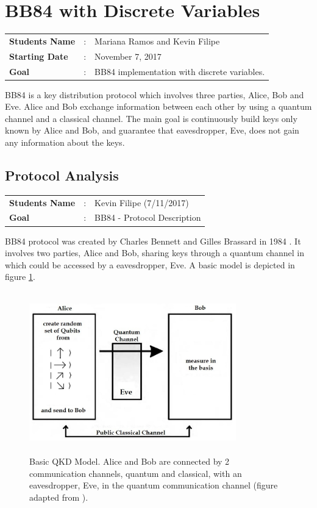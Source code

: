 \clearpage
\section{BB84 with Discrete Variables}

\begin{tcolorbox}	
\begin{tabular}{p{2.75cm} p{0.2cm} p{10.5cm}} 	
\textbf{Students Name}  &:& Mariana Ramos and Kevin Filipe\\
\textbf{Starting Date} &:& November 7, 2017\\
\textbf{Goal}          &:& BB84 implementation with discrete variables.
\end{tabular}
\end{tcolorbox}

BB84 is a key distribution protocol which involves three parties, Alice, Bob and Eve. Alice and Bob exchange information between each other by using a quantum channel and a classical channel. The main goal is continuously build keys only known by Alice and Bob, and guarantee that eavesdropper, Eve, does not gain any information about the keys.


\subsection{Protocol Analysis}
\begin{tcolorbox}	
	\begin{tabular}{p{2.75cm} p{0.2cm} p{10.5cm}} 	
		\textbf{Students Name}  &:& Kevin Filipe (7/11/2017)\\
		\textbf{Goal}          &:& BB84 - Protocol Description
	\end{tabular}
\end{tcolorbox}

BB84 protocol was created by Charles Bennett and Gilles Brassard in 1984 \cite{BB84}. It involves two parties, Alice and Bob, sharing keys through a quantum channel in which could be accessed by a eavesdropper, Eve. A basic model is depicted in figure \ref{fig:qkd model}. 

\begin{figure}[H]
	\centering
	\includegraphics[width=0.8\textwidth,height=7cm]{./sdf/bb84_with_discrete_variables/figures/QKD_Model.png}
	\caption{Basic QKD Model. Alice and Bob are connected by 2 communication channels, quantum and classical, with an eavesdropper, Eve, in the quantum communication channel (figure adapted from \cite{iqo}).}\label{fig:qkd model}
\end{figure}

